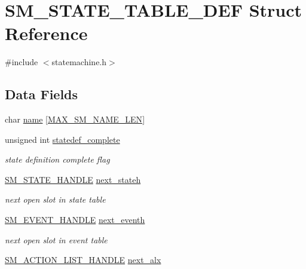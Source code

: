 \hypertarget{struct_s_m___s_t_a_t_e___t_a_b_l_e___d_e_f}{\section{S\-M\-\_\-\-S\-T\-A\-T\-E\-\_\-\-T\-A\-B\-L\-E\-\_\-\-D\-E\-F Struct Reference}
\label{struct_s_m___s_t_a_t_e___t_a_b_l_e___d_e_f}
}


{\ttfamily \#include $<$statemachine.\-h$>$}

\subsection*{Data Fields}
\begin{DoxyCompactItemize}
\item 
char \hyperlink{struct_s_m___s_t_a_t_e___t_a_b_l_e___d_e_f_aef62a5c3d3f28b912cb9864df5c8cd4f}{name} \mbox{[}\hyperlink{statemachine_8h_a13c4f043ac1358c6782b02f76ff96135}{M\-A\-X\-\_\-\-S\-M\-\_\-\-N\-A\-M\-E\-\_\-\-L\-E\-N}\mbox{]}
\item 
unsigned int \hyperlink{struct_s_m___s_t_a_t_e___t_a_b_l_e___d_e_f_aac1ff37dce11dcff67359f103bc2a193}{statedef\-\_\-complete}
\begin{DoxyCompactList}\small\item\em state definition complete flag \end{DoxyCompactList}\item 
\hyperlink{statemachine_8h_aa30fadf137d8a09eceea2a2d973be5ef}{S\-M\-\_\-\-S\-T\-A\-T\-E\-\_\-\-H\-A\-N\-D\-L\-E} \hyperlink{struct_s_m___s_t_a_t_e___t_a_b_l_e___d_e_f_aeb6ac427ff3b34dd686aa165325f0895}{next\-\_\-stateh}
\begin{DoxyCompactList}\small\item\em next open slot in state table \end{DoxyCompactList}\item 
\hyperlink{statemachine_8h_acb17336d3c3a21ee8233cec54bb55b4f}{S\-M\-\_\-\-E\-V\-E\-N\-T\-\_\-\-H\-A\-N\-D\-L\-E} \hyperlink{struct_s_m___s_t_a_t_e___t_a_b_l_e___d_e_f_a83a349559cb62ecc1dbc314298e294a3}{next\-\_\-eventh}
\begin{DoxyCompactList}\small\item\em next open slot in event table \end{DoxyCompactList}\item 
\hyperlink{statemachine_8h_a6f0ccd0b6cfa6e37d337d865442ee93b}{S\-M\-\_\-\-A\-C\-T\-I\-O\-N\-\_\-\-L\-I\-S\-T\-\_\-\-H\-A\-N\-D\-L\-E} \hyperlink{struct_s_m___s_t_a_t_e___t_a_b_l_e___d_e_f_a61c13777dc9b48d235c2a3e0f41da4dc}{next\-\_\-alx}

\end{DoxyCompactItemize}
